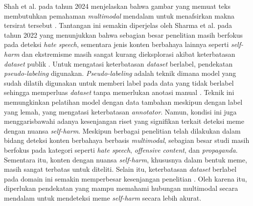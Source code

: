 Shah et al. pada tahun 2024  menjelaskan bahwa gambar yang memuat teks membutuhkan pemahaman \textit{multimodal} mendalam untuk menafsirkan makna tersirat tersebut \cite{shah2024memeclip}. Tantangan ini semakin diperjelas oleh Sharma et al. pada tahun 2022 yang menunjukkan bahwa sebagian besar penelitian masih berfokus pada deteksi \textit{hate speech}, sementara jenis konten berbahaya lainnya seperti \textit{self-harm} dan ekstremisme masih sangat kurang dieksplorasi akibat keterbatasan \textit{dataset} publik \cite{Sharma2022HarmfulMemes}. Untuk mengatasi keterbatasan \textit{dataset} berlabel, pendekatan \textit{pseudo-labeling} digunakan. \textit{Pseudo-labeling} adalah teknik dimana model yang sudah dilatih digunakan untuk memberi label pada data yang tidak berlabel sehingga memperluas \textit{dataset} tanpa memerlukan anotasi manual \cite{lee_pseudo2013}. Teknik ini memungkinkan pelatihan model dengan data tambahan meskipun dengan label yang lemah, yang mengatasi keterbatasan \textit{annotator}. Namun, kondisi ini juga menggarisbawahi adanya kesenjangan riset yang signifikan terkait deteksi meme dengan nuansa \textit{self-harm}. Meskipun berbagai penelitian telah dilakukan dalam bidang deteksi konten berbahaya berbasis \textit{multimodal}, sebagian besar studi masih berfokus pada kategori seperti \textit{hate speech}, \textit{offensive content}, dan \textit{propaganda}. Sementara itu, konten dengan nuansa \textit{self-harm}, khususnya dalam bentuk meme, masih sangat terbatas untuk diteliti. Selain itu, keterbatasan \textit{dataset} berlabel pada domain ini semakin memperbesar kesenjangan penelitian \cite{zhang2025impact}. Oleh karena itu, diperlukan pendekatan yang mampu memahami hubungan multimodal secara mendalam untuk mendeteksi meme \textit{self-harm} secara lebih akurat.


